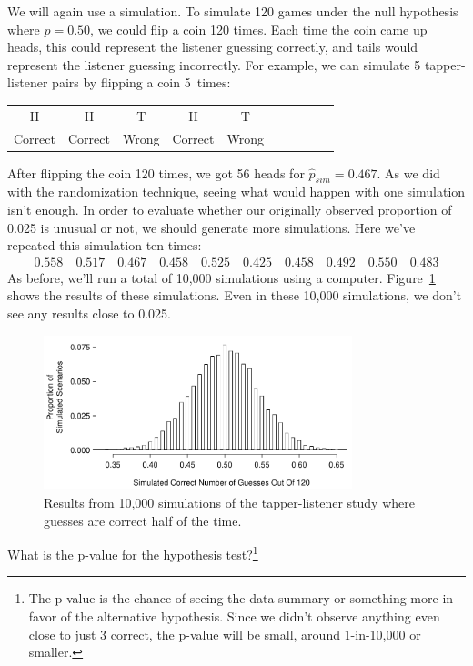 We will again use a simulation. To simulate 120 games under the null hypothesis where $p = 0.50$, we could flip a coin 120 times. Each time the coin came up heads, this could represent the listener guessing correctly, and tails would represent the listener guessing incorrectly. For example, we can simulate 5 tapper-listener pairs by flipping a coin 5~times:
\begin{center}
\begin{tabular}{ccc ccc ccc c}
H & H & T & H & T \\
Correct & Correct & Wrong & Correct & Wrong \\
\end{tabular}
\end{center}
After flipping the coin 120 times, we got 56 heads for $\hat{p}_{sim} = 0.467$. As we did with the randomization technique, seeing what would happen with one simulation isn't enough. In order to evaluate whether our originally observed proportion of 0.025 is unusual or not, we should generate more simulations. Here we've repeated this simulation ten times:
\begin{align*}
0.558 \quad 0.517 \quad 0.467 \quad 0.458 \quad
0.525 \quad 0.425 \quad 0.458 \quad 0.492 \quad
0.550 \quad 0.483
\end{align*} %
As before, we'll run a total of 10,000 simulations using a computer. Figure~\ref{TappersAndListenersNullDistribution} shows the results of these simulations. Even in these 10,000 simulations, we don't see any results close to 0.025.

\begin{figure}[ht]
\centering
\includegraphics[width=0.8\textwidth]{02/figures/TappersAndListeners/TappersAndListenersNullDistribution}
\caption{Results from 10,000 simulations of the tapper-listener study where guesses are correct half of the time.}
\label{TappersAndListenersNullDistribution}
\end{figure}

\begin{exercise}
What is the p-value for the hypothesis test?\footnote{The p-value is the chance of seeing the data summary or something more in favor of the alternative hypothesis. Since we didn't observe anything even close to just 3 correct, the p-value will be small, around 1-in-10,000 or smaller.}
\end{exercise}

